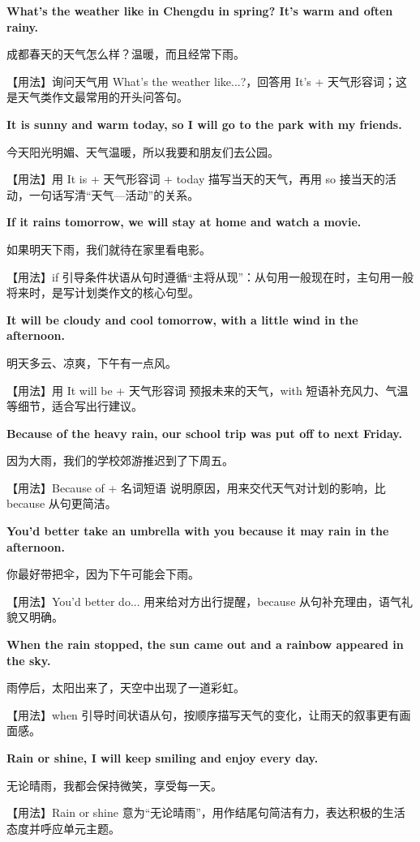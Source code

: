 \documentclass[UTF8,a4paper,11pt,oneside]{ctexbook}
\newcommand{\fansection}[1]{%
  \par\addvspace{2.4ex}%
  \Needspace{6\baselineskip}%
  \noindent{\sffamily\Large\bfseries\color{mainblue}#1}\par
  \nopagebreak
  \addvspace{0.2ex}%
  \noindent{\color{rulelight}\rule{\linewidth}{0.9pt}}\par
  \addvspace{0.9ex}%
  \nobreak
}
\newcommand{\fanpat}[3]{%
  \item{\bfseries #1}\par\nopagebreak
  {\small\color{textgray}#2}\par\nopagebreak
  {\footnotesize\color{accent!90!black}【用法】#3}\par
}
\begin{document}
\fansection{〇、本单元写作常用句型}
\begin{fanpatterns}
\fanpat{What's the weather like in Chengdu in spring? It's warm and often rainy.}{成都春天的天气怎么样？温暖，而且经常下雨。}{询问天气用 What's the weather like...?，回答用 It's + 天气形容词；这是天气类作文最常用的开头问答句。}

\fanpat{It is sunny and warm today, so I will go to the park with my friends.}{今天阳光明媚、天气温暖，所以我要和朋友们去公园。}{用 It is + 天气形容词 + today 描写当天的天气，再用 so 接当天的活动，一句话写清“天气—活动”的关系。}

\fanpat{If it rains tomorrow, we will stay at home and watch a movie.}{如果明天下雨，我们就待在家里看电影。}{if 引导条件状语从句时遵循“主将从现”：从句用一般现在时，主句用一般将来时，是写计划类作文的核心句型。}

\fanpat{It will be cloudy and cool tomorrow, with a little wind in the afternoon.}{明天多云、凉爽，下午有一点风。}{用 It will be + 天气形容词 预报未来的天气，with 短语补充风力、气温等细节，适合写出行建议。}

\fanpat{Because of the heavy rain, our school trip was put off to next Friday.}{因为大雨，我们的学校郊游推迟到了下周五。}{Because of + 名词短语 说明原因，用来交代天气对计划的影响，比 because 从句更简洁。}

\fanpat{You'd better take an umbrella with you because it may rain in the afternoon.}{你最好带把伞，因为下午可能会下雨。}{You'd better do... 用来给对方出行提醒，because 从句补充理由，语气礼貌又明确。}

\fanpat{When the rain stopped, the sun came out and a rainbow appeared in the sky.}{雨停后，太阳出来了，天空中出现了一道彩虹。}{when 引导时间状语从句，按顺序描写天气的变化，让雨天的叙事更有画面感。}

\fanpat{Rain or shine, I will keep smiling and enjoy every day.}{无论晴雨，我都会保持微笑，享受每一天。}{Rain or shine 意为“无论晴雨”，用作结尾句简洁有力，表达积极的生活态度并呼应单元主题。}

\end{fanpatterns}

\fansection{一、满分范文}
\end{document}
